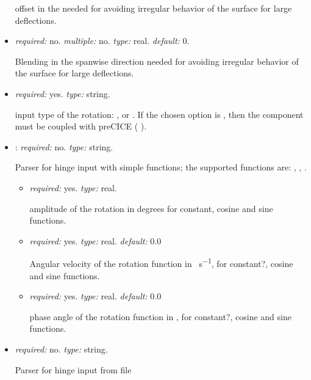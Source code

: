 \begin{itemize}
    offset in the  needed for avoiding irregular behavior of the surface for large deflections.

    \item {} \textit{required:} no. \textit{multiple:} no. \textit{type:} real. \textit{default:} 0.
    
    Blending in the spanwise direction needed for avoiding irregular behavior of the surface for large deflections.
    
    \item {}
    \textit{required:} yes. \textit{type:} string.
    
    input type of the rotation: ,  or . 
    If the chosen option is , then the component must be coupled with preCICE ( ).
    
    \item {}: \textit{required:} no. \textit{type:} string. 
    
    Parser for hinge input with simple functions; the supported functions are: 
    , , . 
    \begin{itemize}
        \item {} \textit{required:} yes. \textit{type:} real. 
        
        amplitude of the rotation in degrees for constant, cosine and sine functions. 
        
        \item {} \textit{required:} yes. \textit{type:} real. \textit{default:} 0.0 
        
        Angular velocity of the rotation function in \si{\deg\per\second}, for constant?, cosine and sine functions.
        
        \item {} \textit{required:} yes. \textit{type:} real. \textit{default:} 0.0
        
        phase angle of the rotation function in \si{\deg}, for constant?, cosine and sine functions.
    \end{itemize}
    \item {} \textit{required:} no. \textit{type:} string. 
    
    Parser for hinge input from file
    

\end{itemize}
